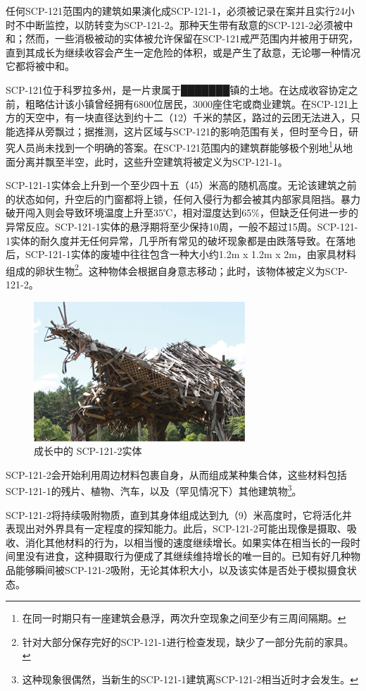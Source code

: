 任何SCP-121范围内的建筑如果演化成SCP-121-1，必须被记录在案并且实行24小时不中断监控，以防转变为SCP-121-2。那种天生带有敌意的SCP-121-2必须被中和；然而，一些消极被动的实体被允许保留在SCP-121戒严范围内并被用于研究，直到其成长为继续收容会产生一定危险的体积，或是产生了敌意，无论哪一种情况它都将被中和。

SCP-121位于科罗拉多州，是一片隶属于███████镇的土地。在达成收容协定之前，粗略估计该小镇曾经拥有6800位居民，3000座住宅或商业建筑。在SCP-121上方的天空中，有一块直径达到约十二（12）千米的禁区，路过的云团无法进入，只能选择从旁飘过；据推测，这片区域与SCP-121的影响范围有关，但时至今日，研究人员尚未找到一个明确的答案。在SCP-121范围内的建筑群能够极个别地\footnote{在同一时期只有一座建筑会悬浮，两次升空现象之间至少有三周间隔期。}从地面分离并飘至半空，此时，这些升空建筑将被定义为SCP-121-1。

SCP-121-1实体会上升到一个至少四十五（45）米高的随机高度。无论该建筑之前的状态如何，升空后的门窗都将上锁，任何入侵行为都会被其内部家具阻挡。暴力破开闯入则会导致环境温度上升至35℃，相对湿度达到65\%，但缺乏任何进一步的异常反应。SCP-121-1实体的悬浮期将至少保持10周，一般不超过15周。SCP-121-1实体的耐久度并无任何异常，几乎所有常见的破坏现象都是由跌落导致。在落地后，SCP-121-1实体的废墟中往往包含一种大小约1.2m x 1.2m x 2m，由家具材料组成的卵状生物\footnote{针对大部分保存完好的SCP-121-1进行检查发现，缺少了一部分先前的家具。}。这种物体会根据自身意志移动；此时，该物体被定义为SCP-121-2。

\begin{figure}[H]
    \centering
    \includegraphics[width=0.5\linewidth]{images/SCP.121.2.png}
    \caption*{成长中的 SCP-121-2实体}
\end{figure}

SCP-121-2会开始利用周边材料包裹自身，从而组成某种集合体，这些材料包括SCP-121-1的残片、植物、汽车，以及（罕见情况下）其他建筑物\footnote{这种现象很偶然，当新生的SCP-121-1建筑离SCP-121-2相当近时才会发生。}。

SCP-121-2将持续吸附物质，直到其身体组成达到九（9）米高度时，它将活化并表现出对外界具有一定程度的探知能力。此后，SCP-121-2可能出现像是摄取、吸收、消化其他材料的行为，以相当慢的速度继续增长。如果实体在相当长的一段时间里没有进食，这种摄取行为便成了其继续维持增长的唯一目的。已知有好几种物品能够瞬间被SCP-121-2吸附，无论其体积大小，以及该实体是否处于模拟摄食状态。

